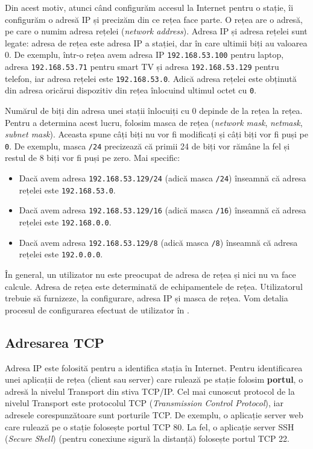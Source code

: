 Din acest motiv, atunci când configurăm accesul la Internet pentru o stație, îi configurăm o adresă IP și precizăm din ce rețea face parte.
O rețea are o adresă, pe care o numim adresa rețelei (\textit{network address}).
Adresa IP și adresa rețelei sunt legate: adresa de rețea este adresa IP a stației, dar în care ultimii biți au valoarea 0.
De exemplu, într-o rețea avem adresa IP \texttt{192.168.53.100} pentru laptop, adresa \texttt{192.168.53.71} pentru smart TV și adresa \texttt{192.168.53.129} pentru telefon, iar adresa rețelei este \texttt{192.168.53.0}.
Adică adresa rețelei este obținută din adresa oricărui dispozitiv din rețea înlocuind ultimul octet cu \texttt{0}.

Numărul de biți din adresa unei stații înlocuiți cu 0 depinde de la rețea la rețea.
Pentru a determina acest lucru, folosim masca de rețea (\textit{network mask}, \textit{netmask}, \textit{subnet mask}).
Aceasta spune câți biți nu vor fi modificați și câți biți vor fi puși pe \texttt{0}.
De exemplu, masca \texttt{/24} precizează că primii 24 de biți vor rămâne la fel și restul de 8 biți vor fi puși pe zero.
Mai specific:

\begin{itemize}
  \item Dacă avem adresa \texttt{192.168.53.129/24} (adică masca \texttt{/24}) înseamnă că adresa rețelei este \texttt{192.168.53.0}.
  \item Dacă avem adresa \texttt{192.168.53.129/16} (adică masca \texttt{/16}) înseamnă că adresa rețelei este \texttt{192.168.0.0}.
  \item Dacă avem adresa \texttt{192.168.53.129/8} (adică masca \texttt{/8}) înseamnă că adresa rețelei este \texttt{192.0.0.0}.
\end{itemize}

În general, un utilizator nu este preocupat de adresa de rețea și nici nu va face calcule.
Adresa de rețea este determinată de echipamentele de rețea.
Utilizatorul trebuie să furnizeze, la configurare, adresa IP și masca de rețea.
Vom detalia procesul de configurarea efectuat de utilizator în .

\subsection{Adresarea TCP}
\label{sec:net:tcp-ip:tcp-address}

Adresa IP este folosită pentru a identifica stația în Internet.
Pentru identificarea unei aplicații de rețea (client sau server) care rulează pe stație folosim \textbf{portul}, o adresă la nivelul Transport din stiva TCP/IP.
Cel mai cunoscut protocol de la nivelul Transport este protocolul TCP (\textit{Transmission Control Protocol}), iar adresele corespunzătoare sunt porturile TCP.
De exemplu, o aplicație server web care rulează pe o stație folosește portul TCP 80. La fel, o aplicație server SSH (\textit{Secure Shell}) (pentru conexiune sigură la distanță) folosește portul TCP 22.

